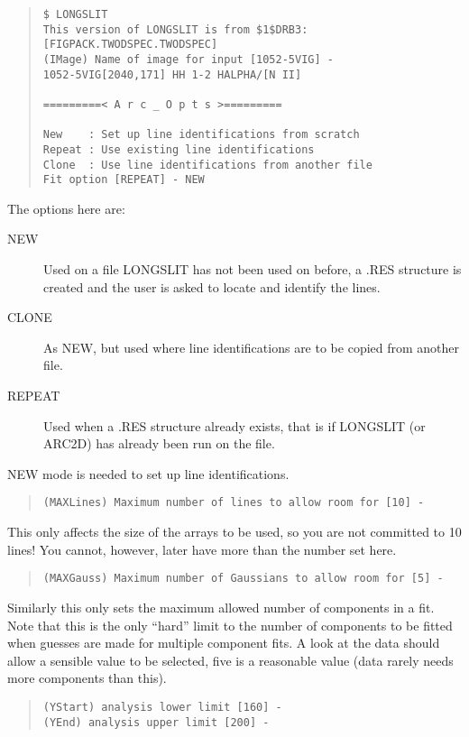 \begin{quote}\begin{verbatim}
$ LONGSLIT 
This version of LONGSLIT is from $1$DRB3:[FIGPACK.TWODSPEC.TWODSPEC]
(IMage) Name of image for input [1052-5VIG] -
1052-5VIG[2040,171] HH 1-2 HALPHA/[N II]

=========< A r c _ O p t s >=========
 
New    : Set up line identifications from scratch
Repeat : Use existing line identifications
Clone  : Use line identifications from another file
Fit option [REPEAT] - NEW
\end{verbatim}\end{quote}
The options here are:
\begin{description}
\item[NEW] Used on a file LONGSLIT has not been used on before, a
.RES structure is created and the user is asked to locate and identify
the lines.
\item[CLONE] As NEW, but used where line identifications are to be
copied from another file.
\item[REPEAT] Used when a .RES structure already exists, that is if
LONGSLIT (or ARC2D) has already been run on the file.
\end{description}
NEW mode is needed to set up line identifications.
\begin{quote}\begin{verbatim}
(MAXLines) Maximum number of lines to allow room for [10] -
\end{verbatim}\end{quote}
This only affects the size of the arrays to be used, so you are not
committed to 10 lines!
You cannot, however, later have more than the number set here.
\begin{quote}\begin{verbatim}
(MAXGauss) Maximum number of Gaussians to allow room for [5] -
\end{verbatim}\end{quote}
Similarly this only sets the maximum allowed number of components in a
fit.
Note that this is the only ``hard'' limit to the number of components to
be fitted when guesses are made for multiple component fits.
A look at the data should allow a sensible value to be selected, five is
a reasonable value (data rarely needs more components than this).
\begin{quote}\begin{verbatim}
(YStart) analysis lower limit [160] -
(YEnd) analysis upper limit [200] -
\end{verbatim}\end{quote}
